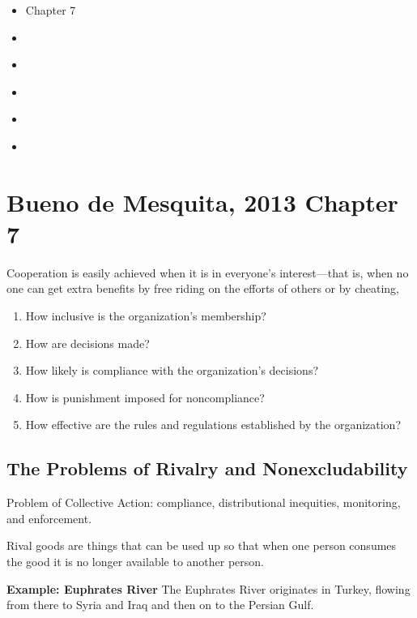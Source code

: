 \begin{itemize}
    \item [***] \textcite{buenodemesquitaPrinciplesInternationalPolitics2013} Chapter 7
    \item [***] \textcite{abbottWhyStatesAct1998}
    \item \textcite{leedsAlliancesDeterAggression2003}
    \item \textcite{morrowAlliancesWhyWrite2000}
    \item \textcite{koremenosRationalDesignInternational2001}
    \item \textcite{lallInstitutionalDesignExplaining2017}
\end{itemize}

\section{Bueno de Mesquita, 2013 Chapter 7}

Cooperation is easily achieved when it is in everyone’s interest—that is,
when no one can get extra benefits by free riding on the efforts of others or by cheating,

\begin{enumerate}
    \item How inclusive is the organization's membership?

    \item How are decisions made?

    \item How likely is compliance with the organization's decisions?

    \item How is punishment imposed for noncompliance?

    \item How effective are the rules and regulations established by the organization?
\end{enumerate}

\subsection{The Problems of Rivalry and Nonexcludability}
Problem of Collective Action: compliance, distributional inequities, monitoring, and enforcement.

Rival goods are things that can be used up so that when one person consumes the good it is no longer available to another person.

\textbf{Example: Euphrates River} The Euphrates River originates in Turkey, flowing from there to Syria and Iraq and then on to the Persian Gulf.

